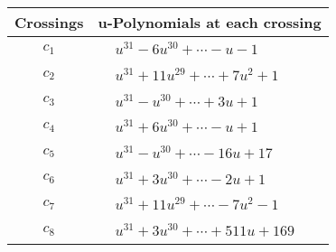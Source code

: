 \documentclass[1p]{elsarticle_modified}
\theoremstyle{definition}
\begin{document}
\begin{tabular}{m{50pt}|m{274pt}}
Crossings & \hspace{64pt}u-Polynomials at each crossing \\
\hline $$\begin{aligned}c_{1}\end{aligned}$$&$\begin{aligned}
&u^{31}-6 u^{30}+\cdots- u-1
\end{aligned}$\\
\hline $$\begin{aligned}c_{2}\end{aligned}$$&$\begin{aligned}
&u^{31}+11 u^{29}+\cdots+7 u^2+1
\end{aligned}$\\
\hline $$\begin{aligned}c_{3}\end{aligned}$$&$\begin{aligned}
&u^{31}- u^{30}+\cdots+3 u+1
\end{aligned}$\\
\hline $$\begin{aligned}c_{4}\end{aligned}$$&$\begin{aligned}
&u^{31}+6 u^{30}+\cdots- u+1
\end{aligned}$\\
\hline $$\begin{aligned}c_{5}\end{aligned}$$&$\begin{aligned}
&u^{31}- u^{30}+\cdots-16 u+17
\end{aligned}$\\
\hline $$\begin{aligned}c_{6}\end{aligned}$$&$\begin{aligned}
&u^{31}+3 u^{30}+\cdots-2 u+1
\end{aligned}$\\
\hline $$\begin{aligned}c_{7}\end{aligned}$$&$\begin{aligned}
&u^{31}+11 u^{29}+\cdots-7 u^2-1
\end{aligned}$\\
\hline $$\begin{aligned}c_{8}\end{aligned}$$&$\begin{aligned}
&u^{31}+3 u^{30}+\cdots+511 u+169
\end{aligned}$\\

\end{tabular}
\end{document}
